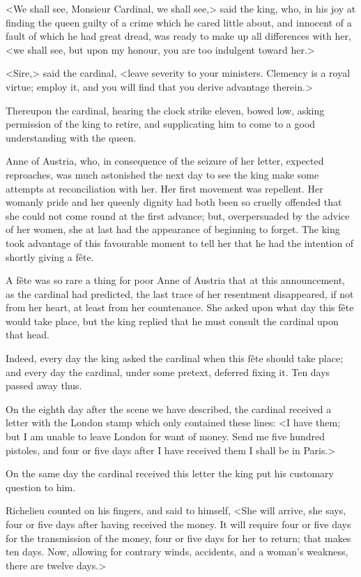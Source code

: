 <We shall see, Monsieur Cardinal, we shall see,> said the king, who, in his joy at finding the queen guilty of a crime which he cared little about, and innocent of a fault of which he had great dread, was ready to make up all differences with her, <we shall see, but upon my honour, you are too indulgent toward her.> 

<Sire,> said the cardinal, <leave severity to your ministers. Clemency is a royal virtue; employ it, and you will find that you derive advantage therein.> 

Thereupon the cardinal, hearing the clock strike eleven, bowed low, asking permission of the king to retire, and supplicating him to come to a good understanding with the queen. 

Anne of Austria, who, in consequence of the seizure of her letter, expected reproaches, was much astonished the next day to see the king make some attempts at reconciliation with her. Her first movement was repellent. Her womanly pride and her queenly dignity had both been so cruelly offended that she could not come round at the first advance; but, overpersuaded by the advice of her women, she at last had the appearance of beginning to forget. The king took advantage of this favourable moment to tell her that he had the intention of shortly giving a fête. 

A fête was so rare a thing for poor Anne of Austria that at this announcement, as the cardinal had predicted, the last trace of her resentment disappeared, if not from her heart, at least from her countenance. She asked upon what day this fête would take place, but the king replied that he must consult the cardinal upon that head. 

Indeed, every day the king asked the cardinal when this fête should take place; and every day the cardinal, under some pretext, deferred fixing it. Ten days passed away thus. 

On the eighth day after the scene we have described, the cardinal received a letter with the London stamp which only contained these lines: <I have them; but I am unable to leave London for want of money. Send me five hundred pistoles, and four or five days after I have received them I shall be in Paris.> 

On the same day the cardinal received this letter the king put his customary question to him. 

Richelieu counted on his fingers, and said to himself, <She will arrive, she says, four or five days after having received the money. It will require four or five days for the transmission of the money, four or five days for her to return; that makes ten days. Now, allowing for contrary winds, accidents, and a woman's weakness, there are twelve days.> 

